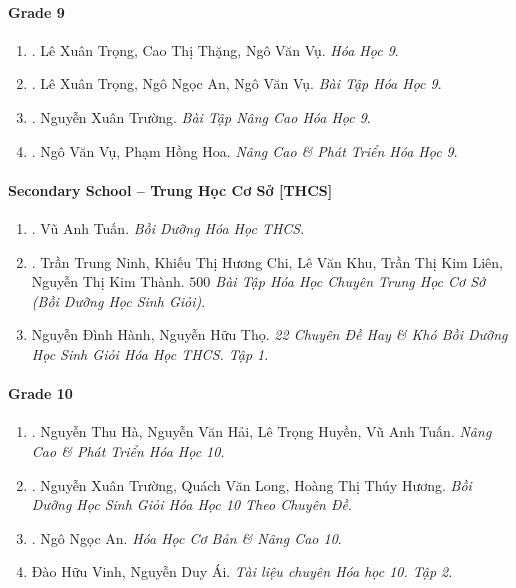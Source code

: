 \documentclass{article}
\begin{document}
\paragraph{Grade 9}

\begin{enumerate}	
	\item \cite{SGK_Hoa_Hoc_9}. Lê Xuân Trọng, Cao Thị Thặng, Ngô Văn Vụ. {\it Hóa Học 9}.\hfill{\sf[reading]}
	
	\item \cite{SBT_Hoa_Hoc_9}. Lê Xuân Trọng, Ngô Ngọc An, Ngô Văn Vụ. {\it Bài Tập Hóa Học 9}.\hfill{\sf[reading]}
	
	\item \cite{Truong_BTNC_Hoa_Hoc_9_2021}. Nguyễn Xuân Trường. {\it Bài Tập Nâng Cao Hóa Học 9}.\hfill{\sf[reading]}
	
	\item \cite{Vu_Hoa2021}. Ngô Văn Vụ, Phạm Hồng Hoa. {\it Nâng Cao \& Phát Triển Hóa Học 9}.\hfill{\sf[reading]}
\end{enumerate}

\paragraph{Secondary School -- Trung Học Cơ Sở [THCS]}

\begin{enumerate}
	\item \cite{Tuan2022}. Vũ Anh Tuấn. {\it Bồi Dưỡng Hóa Học THCS}.\hfill{\sf[reading]}
	
	\item \cite{Ninh_Chi_Khu_Lien_Thanh2019}. Trần Trung Ninh, Khiếu Thị Hương Chi, Lê Văn Khu, Trần Thị Kim Liên, Nguyễn Thị Kim Thành. {\it $500$ Bài Tập Hóa Học Chuyên Trung Học Cơ Sở (Bồi Dưỡng Học Sinh Giỏi)}.\hfill{\sf[reading]}
	
	\item Nguyễn Đình Hành, Nguyễn Hữu Thọ. {\it 22 Chuyên Đề Hay \& Khó Bồi Dưỡng Học Sinh Giỏi Hóa Học THCS. Tập 1}.
\end{enumerate}

\paragraph{Grade 10}

\begin{enumerate}
	\item \cite{Ha_Hai_Huyen_Tuan2022}. Nguyễn Thu Hà, Nguyễn Văn Hải, Lê Trọng Huyền, Vũ Anh Tuấn. {\it Nâng Cao \& Phát Triển Hóa Học 10}.\hfill{\sf[reading]}
	
	\item \cite{Truong_Long_Huong_bdhsg_Hoa_Hoc_10}. Nguyễn Xuân Trường, Quách Văn Long, Hoàng Thị Thúy Hương. {\it Bồi Dưỡng Học Sinh Giỏi Hóa Học 10 Theo Chuyên Đề}.\hfill{\sf[reading]}
	\item \cite{An_Hoa_Hoc_co_ban_nang_cao_10}. Ngô Ngọc An. {\it Hóa Học Cơ Bản \& Nâng Cao 10}.\hfill{\sf[reading]}
	
	\item Đào Hữu Vinh, Nguyễn Duy Ái. {\it Tài liệu chuyên Hóa học 10. Tập 2}.\hfill{\sf[reading]}
\end{enumerate}
\end{document}
